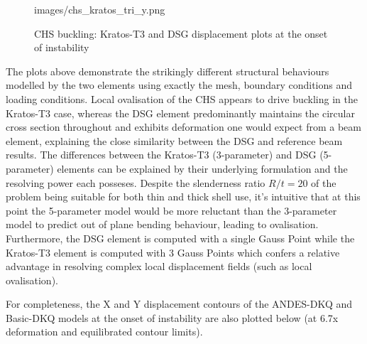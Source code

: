 \begin{figure}[H]
{		{images/chs_kratos_tri_y.png}}
	\caption{\label{chs buckling pics1}CHS buckling: Kratos-T3 and DSG displacement plots at the onset of instability}
\end{figure}

The plots above demonstrate the strikingly different structural behaviours modelled by the two elements using exactly the mesh, boundary conditions and loading conditions. Local ovalisation of the CHS appears to drive buckling in the Kratos-T3 case, whereas the DSG element predominantly maintains the circular cross section throughout and exhibits deformation one would expect from a beam element, explaining the close similarity between the DSG and reference beam results. The differences between the Kratos-T3 (3-parameter) and DSG (5-parameter) elements can be explained by their underlying formulation and the resolving power each posseses. Despite the slenderness ratio $R/t = 20$ of the problem being suitable for both thin and thick shell use, it's intuitive that at this point the 5-parameter model would be more reluctant than the 3-parameter model to predict out of plane bending behaviour, leading to ovalisation. Furthermore, the DSG element is computed with a single Gauss Point while the Kratos-T3 element is computed with 3 Gauss Points which confers a relative advantage in resolving complex local displacement fields (such as local ovalisation).

For completeness, the X and Y displacement contours of the ANDES-DKQ and Basic-DKQ models at the onset of instability are also plotted below (at 6.7x deformation and equilibrated contour limits).

